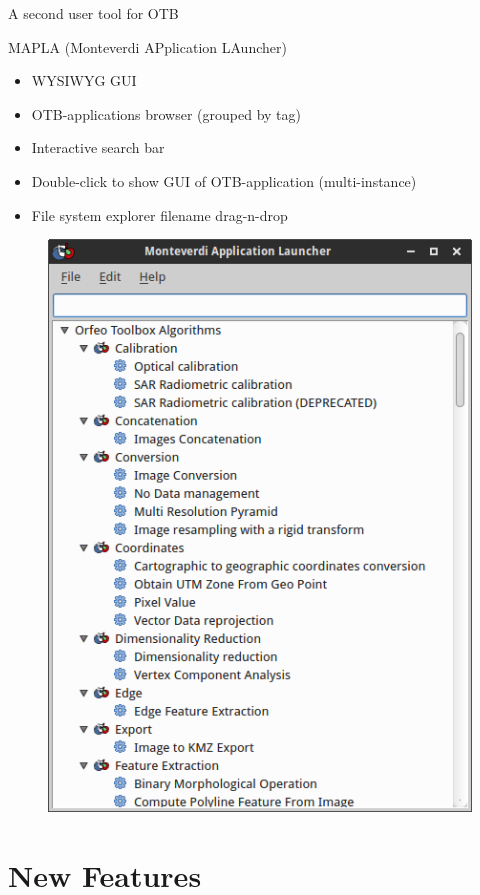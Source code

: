 \documentclass[smaller]{beamer}
\begin{document}
\begin{frame}{A second user tool for OTB}

MAPLA (Monteverdi APplication LAuncher)
\begin{itemize}
  \item WYSIWYG GUI
  \item OTB-applications browser (grouped by tag)
  \item Interactive search bar
  \item Double-click to show GUI of OTB-application (multi-instance)
  \item File system explorer filename drag-n-drop
\end{itemize}

\begin{figure}[ht]
\begin{center}
\includegraphics[scale=0.23]{images/2016-06-06_MVD_Mapla.png}
\end{center}
\end{figure}

\end{frame}

\section{New Features}
\end{document}

